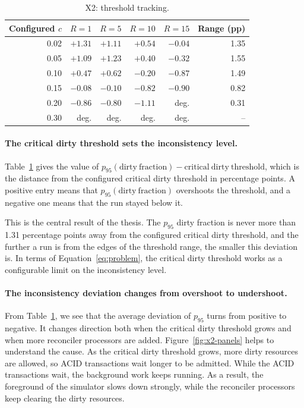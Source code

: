 \begin{table}[!htb]
  \centering
  \captionsetup{format=plain,justification=centering}
  \caption{X2: threshold tracking.}
  \label{tab:x2-tracking}
  \small
  \begin{tabular}{r r r r r r}
    \toprule
    Configured $c$ & $R = 1$ & $R = 5$ & $R = 10$ & $R = 15$ & Range (pp) \\
    \midrule
    0.02           & $+1.31$ & $+1.11$ & $+0.54$  & $-0.04$  & 1.35       \\
    0.05           & $+1.09$ & $+1.23$ & $+0.40$  & $-0.32$  & 1.55       \\
    0.10           & $+0.47$ & $+0.62$ & $-0.20$  & $-0.87$  & 1.49       \\
    0.15           & $-0.08$ & $-0.10$ & $-0.82$  & $-0.90$  & 0.82       \\
    0.20           & $-0.86$ & $-0.80$ & $-1.11$  & deg.     & 0.31       \\
    0.30           & deg.    & deg.    & deg.     & deg.     & --         \\
    \bottomrule
  \end{tabular}
\end{table}

\paragraph{The critical dirty threshold sets the inconsistency
  level.}\label{sec:x2-tracking} Table~\ref{tab:x2-tracking} gives the value of
$p_{95}(\mathrm{dirty\ fraction}) - \mathrm{critical\ dirty\ threshold}$,
which is the distance from the configured critical dirty threshold in
percentage points. A positive entry means that $p_{95}(\mathrm{dirty\ fraction})$
overshoots the threshold, and a negative one means that the run stayed below it.

This is the central result of the thesis. The $p_{95}$ dirty fraction is never
more than 1.31 percentage points away from the configured critical dirty
threshold, and the further a run is from the edges of the threshold range, the
smaller this deviation is. In terms of
Equation~\ref{eq:problem}, the critical dirty threshold works as a configurable
limit on the inconsistency level.

\paragraph{The inconsistency deviation changes from overshoot to undershoot.} From
Table~\ref{tab:x2-tracking}, we see that the average deviation of $p_{95}$ turns
from positive to negative. It changes direction both when the critical dirty
threshold grows and when more reconciler processors are added.
Figure~\ref{fig:x2-panels} helps to understand the cause. As the critical dirty
threshold grows, more dirty resources are allowed, so ACID transactions wait
longer to be admitted. While the ACID transactions wait, the background work
keeps running. As a result, the foreground of the simulator slows down strongly,
while the reconciler processors keep clearing the dirty resources.

